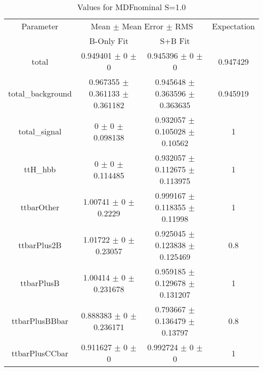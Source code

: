 \begin{table}
\centering
\caption{Values for MDFnominal S=1.0}
\begin{tabular}{cccc}
\toprule
Parameter & \multicolumn{2}{c}{Mean $\pm$ Mean Error $\pm$ RMS} & Expectation\\
 & B-Only Fit & S+B Fit & \\
\midrule
total & \num{0.949401} $\pm$ \num{0} $\pm$ \num{0} & \num{0.945396} $\pm$ \num{0} $\pm$ \num{0} & \num{0.947429}\\
total\_background & \num{0.967355} $\pm$ \num{0.361133} $\pm$ \num{0.361182} & \num{0.945648} $\pm$ \num{0.363596} $\pm$ \num{0.363635} & \num{0.945919}\\
total\_signal & \num{0} $\pm$ \num{0} $\pm$ \num{0.098138} & \num{0.932057} $\pm$ \num{0.105028} $\pm$ \num{0.10562} & \num{1}\\
ttH\_hbb & \num{0} $\pm$ \num{0} $\pm$ \num{0.114485} & \num{0.932057} $\pm$ \num{0.112675} $\pm$ \num{0.113975} & \num{1}\\
ttbarOther & \num{1.00741} $\pm$ \num{0} $\pm$ \num{0.2229} & \num{0.999167} $\pm$ \num{0.118355} $\pm$ \num{0.11998} & \num{1}\\
ttbarPlus2B & \num{1.01722} $\pm$ \num{0} $\pm$ \num{0.23057} & \num{0.925045} $\pm$ \num{0.123838} $\pm$ \num{0.125469} & \num{0.8}\\
ttbarPlusB & \num{1.00414} $\pm$ \num{0} $\pm$ \num{0.231678} & \num{0.959185} $\pm$ \num{0.129678} $\pm$ \num{0.131207} & \num{1}\\
ttbarPlusBBbar & \num{0.888383} $\pm$ \num{0} $\pm$ \num{0.236171} & \num{0.793667} $\pm$ \num{0.136479} $\pm$ \num{0.13797} & \num{0.8}\\
ttbarPlusCCbar & \num{0.911627} $\pm$ \num{0} $\pm$ \num{0} & \num{0.992724} $\pm$ \num{0} $\pm$ \num{0} & \num{1}\\
\bottomrule
\end{tabular}
\end{table}